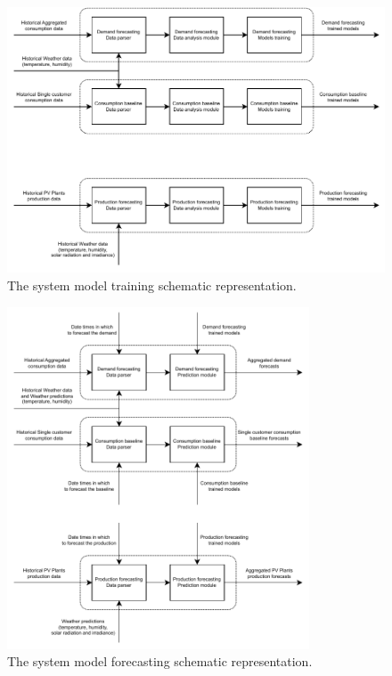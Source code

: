 \begin{figure}[H]
\centering 
\includegraphics[width=1\textwidth]{images/system_model_training} 
\caption{The system model training schematic representation.}
\label{fig:modeltraining}
\end{figure}

\begin{figure}[H]
\centering 
\includegraphics[width=0.8\textwidth]{images/system_model_forecasting} 
\caption{The system model forecasting schematic representation.}
\label{fig:modelforecasting}
\end{figure}


